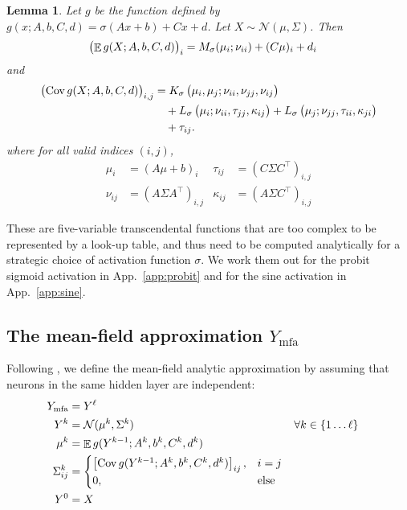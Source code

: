 \documentclass{article}
\newtheorem{lemma}{Lemma}
\DeclareMathOperator{\expect}{\mathbb{E}}
\DeclareMathOperator{\Cov}{\operatorname{Cov}}
\begin{document}
\begin{lemma}
  Let \(g\) be the function defined by \(g(x; A, b, C, d) = \sigma(A
  x+ b) + C x + d\).
  Let \(X \sim \mathcal N(\mu, \Sigma)\).
  Then
  \begin{align*}
    \del{\expect g(X; A, b, C, d)}_i &= M_\sigma(\mu_i; \nu_{ii}) +
    (C\mu)_i + d_i
  \end{align*}
  and
  \begin{align*}
    \begin{split}
      \del{\Cov g(X; A, b, C, d)}_{i, j} &=
        K_\sigma\del{
          \mu_i, \mu_j; \nu_{ii}, \nu_{jj}, \nu_{ij}
        } \\
        &\quad + L_\sigma\del{
          \mu_i; \nu_{ii}, \tau_{jj},\kappa_{ij}
        }
        + L_\sigma\del{
          \mu_j; \nu_{jj}, \tau_{ii},\kappa_{ji}
        } \\
        &\quad + \tau_{ij}.
    \end{split}
  \end{align*}
  where for all valid indices \((i, j)\),
  \begin{align*}
    \mu_i &= (A\mu + b)_i
    &
    \tau_{ij}
    &= (C\Sigma C^\intercal)_{i,j}
    \\
    \nu_{ij} &= (A\Sigma A^\intercal)_{i,j}
    &
    \kappa_{ij}
    &= (A \Sigma C^\intercal)_{i,j}
  \end{align*}
\end{lemma}
These are five-variable transcendental functions that are too complex to be represented by a look-up table, and thus need to be computed analytically for a strategic choice of activation function \(\sigma\).
We work them out for the probit sigmoid activation in App.~\ref{app:probit} and for the sine activation in App.~\ref{app:sine}.

\subsection{The mean-field approximation \(Y_\mathrm{mfa}\)}
Following \citet{huber_bayesian_2020, wagner_kalman_2022,akgul_deterministic_2025}, we define the mean-field analytic approximation by assuming that neurons in the same hidden layer are independent:
\begin{align*}
  Y_\mathrm{mfa} &=  Y^\ell\\
  Y^k &= \mathcal N(\mu^k, \Sigma^k) & \forall k &\in \cbr{1 \ldots \ell} \\
  \mu^k &= \expect g(Y^{k-1}; A^k, b^k, C^k, d^k)
  \\
  \Sigma^k_{ij} &= \begin{cases}
    \sbr{\Cov g(Y^{k-1}; A^k, b^k, C^k, d^k)}_{ij}, & i=j
    \\
    0, &\text{else}
  \end{cases}
  \\
  Y^0 &= X
\end{align*}
\end{document}
